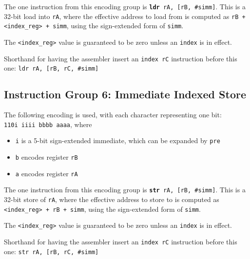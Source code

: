 \documentclass{article}
\begin{document}
	The one instruction from this encoding group is
	\texttt{\textbf{ldr} rA, [rB, \#simm]}.
	This is a 32-bit load into \texttt{rA}, where the effective address to
	load from is computed as \texttt{rB + <index\_reg> + simm}, using the
	sign-extended form of \texttt{simm}.

	The \texttt{<index\_reg>} value is guaranteed to be zero unless an
	\texttt{index} is in effect.

	Shorthand for having the assembler insert an \texttt{index rC}
	instruction before this one: \texttt{ldr rA, [rB, rC, \#simm]}


	\subsection{Instruction Group 6: Immediate Indexed Store}
	The following encoding is used, with each character representing one
	bit: \\
	\texttt{110i iiii bbbb aaaa}, where

	\singlespacing
	\begin{itemize}
	\item \texttt{i} is a 5-bit sign-extended immediate, which can
	be expanded by \texttt{pre}  
	\item \texttt{b} encodes register \texttt{rB}
	\item \texttt{a} encodes register \texttt{rA}
	\end{itemize}
	\doublespacing

	The one instruction from this encoding group is
	\texttt{\textbf{str} rA, [rB, \#simm]}.
	This is a 32-bit store of \texttt{rA}, where the effective address to
	store to is computed as \texttt{<index\_reg> + rB + simm}, using the
	sign-extended form of \texttt{simm}.

	The \texttt{<index\_reg>} value is guaranteed to be zero unless an
	\texttt{index} is in effect.

	Shorthand for having the assembler insert an \texttt{index rC}
	instruction before this one: \texttt{str rA, [rB, rC, \#simm]}


	\doublespacing
\end{document}
